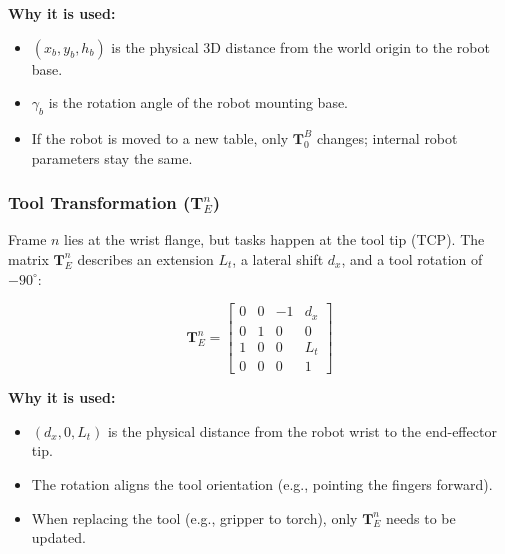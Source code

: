 \documentclass[11pt, a4paper]{article}
\begin{document}
\noindent \textbf{Why it is used:}
\begin{itemize}[leftmargin=1.5em]
    \item $(x_b, y_b, h_b)$ is the physical 3D distance from the world origin to the robot base.
    \item $\gamma_b$ is the rotation angle of the robot mounting base.
    \item If the robot is moved to a new table, only $\mathbf{T}_0^B$ changes; internal robot parameters stay the same.
\end{itemize}

\subsubsection{Tool Transformation \texorpdfstring{($\mathbf{T}_E^n$)}{(TEn)}}
Frame $n$ lies at the wrist flange, but tasks happen at the tool tip (TCP). The matrix $\mathbf{T}_E^n$ describes an extension $L_t$, a lateral shift $d_x$, and a tool rotation of $-90^\circ$:

\begin{equation}
\mathbf{T}_E^n = 
\begin{bmatrix} 
0 & 0 & -1 & d_x \\ 
0 & 1 &  0 & 0   \\ 
1 & 0 &  0 & L_t \\ 
0 & 0 &  0 & 1 
\end{bmatrix}
\end{equation}

\noindent \textbf{Why it is used:}
\begin{itemize}[leftmargin=1.5em]
    \item $(d_x, 0, L_t)$ is the physical distance from the robot wrist to the end-effector tip.
    \item The rotation aligns the tool orientation (e.g., pointing the fingers forward).
    \item When replacing the tool (e.g., gripper to torch), only $\mathbf{T}_E^n$ needs to be updated.
\end{itemize}
\end{document}
